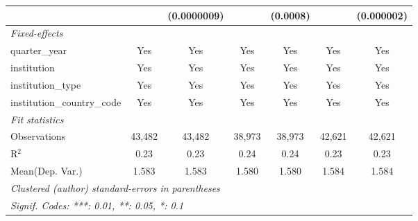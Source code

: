\begin{tabular}{lcccccc}
                                      &               & (0.0000009)   &               & (0.0008)      &               & (0.000002)\\   
   \midrule
   \emph{Fixed-effects}\\
   quarter\_year                      & Yes           & Yes           & Yes           & Yes           & Yes           & Yes\\  
   institution                        & Yes           & Yes           & Yes           & Yes           & Yes           & Yes\\  
   institution\_type                  & Yes           & Yes           & Yes           & Yes           & Yes           & Yes\\  
   institution\_country\_code         & Yes           & Yes           & Yes           & Yes           & Yes           & Yes\\  
   \midrule
   \emph{Fit statistics}\\
   Observations                       & 43,482        & 43,482        & 38,973        & 38,973        & 42,621        & 42,621\\  
   R$^2$                              & 0.23          & 0.23          & 0.24          & 0.24          & 0.23          & 0.23\\  
Mean(Dep. Var.) & 1.583 & 1.583 & 1.580 & 1.580 & 1.584 & 1.584 \\
   \midrule \midrule
   \multicolumn{7}{l}{\emph{Clustered (author) standard-errors in parentheses}}\\
   \multicolumn{7}{l}{\emph{Signif. Codes: ***: 0.01, **: 0.05, *: 0.1}}\\
\end{tabular}
\par\endgroup
